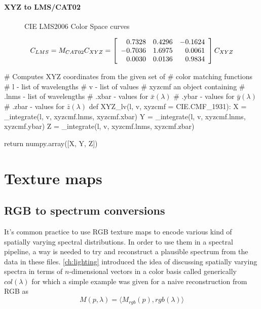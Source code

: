 \ifomit
\paragraph{XYZ to LMS/CAT02}

\begin{figure}
\centering

\caption{CIE LMS2006 Color Space curves}
\label{fig:cielms2006}
\end{figure}

\begin{displaymath}
C_{LMS} = M_{CAT02} C_{XYZ}  = \left[\begin{array}{r@{.}lr@{.}lr@{.}l}
 0&7328 & 0&4296 & -0&1624 \\
-0&7036 & 1&6975 &  0&0061 \\
 0&0030 & 0&0136 &  0&9834 \\
\end{array}\right] C_{XYZ}
\end{displaymath}
\fi


\begin{pythoncode}
# Computes XYZ coordinates from the given set of
# color matching functions
# l - list of wavelengths
# v - list of values
# xyzcmf an object containing
# .lnms - list of wavelengths
# .xbar - values for $\bar{x}(\lambda)$
# .ybar - values for $\bar{y}(\lambda)$
# .zbar - values for $\bar{z}(\lambda)$
def XYZ_lv(l, v, xyzcmf = CIE.CMF_1931):
    X = _integrate(l, v, xyzcmf.lnms, xyzcmf.xbar)
    Y = _integrate(l, v, xyzcmf.lnms, xyzcmf.ybar)
    Z = _integrate(l, v, xyzcmf.lnms, xyzcmf.zbar)

    return numpy.array([X, Y, Z])
\end{pythoncode}


\section{Texture maps}
\label{sec:implementation:texturemaps}

\subsection{RGB to spectrum conversions}

It's common practice to use \gls{RGB} texture maps to encode various
kind of spatially varying spectral distributions. In order to use them
in a spectral pipeline, a way is needed to try and reconstruct a plausible
spectrum from the data in these files. \cref{ch:lighting} introduced
the idea of discussing spatially varying spectra in terms of $n$-dimensional
vectors in a color basis called generically $col(\lambda)$ for which a
simple example was given for a naive reconstruction from \gls{RGB} as
\begin{displaymath}
M(p,\lambda) = \big\langle M_{rgb}(p), rgb(\lambda) \big\rangle
\end{displaymath}

